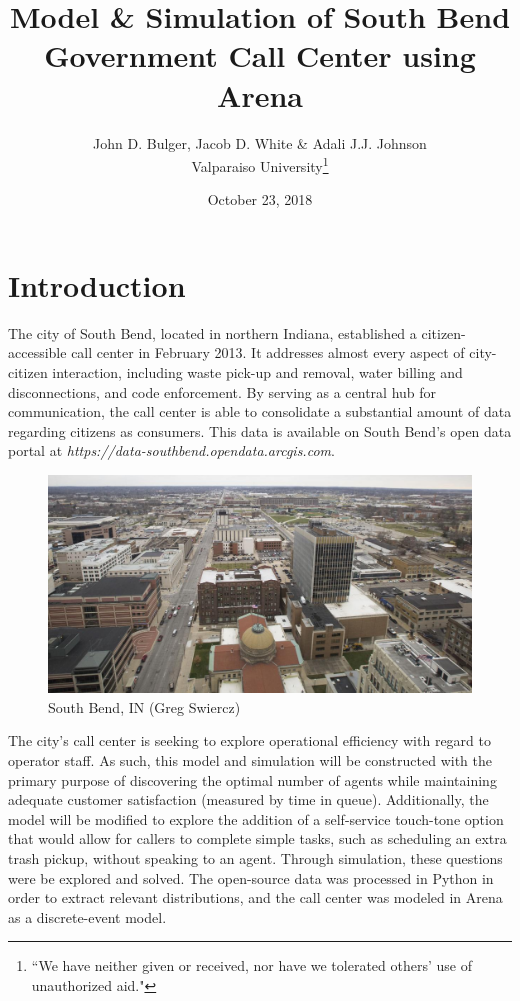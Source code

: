 \documentclass[12pt,twocolumn]{article}
\title{Model \& Simulation of South Bend Government Call Center using Arena}
\author{John D. Bulger, Jacob D. White \& Adali J.J. Johnson\\Valparaiso University\thanks{``We have neither given or received, nor have we tolerated others' use of unauthorized aid."}}
\date{October 23, 2018}
\begin{document}
\maketitle

\section{Introduction}
The city of South Bend, located in northern Indiana, established a citizen-accessible call center in February 2013.  It addresses almost every aspect of city-citizen interaction, including waste pick-up and removal, water billing and disconnections, and code enforcement.  By serving as a central hub for communication, the call center is able to consolidate a substantial amount of data regarding citizens as consumers.  This data is available on South Bend's open data portal at \textit{https://data-southbend.opendata.arcgis.com}.

	\begin{figure}[h]
	\includegraphics[scale=.17]{south_bend.png}
	\caption{South Bend, IN (Greg Swiercz)}
	\end{figure}

\par
The city's call center is seeking to explore operational efficiency with regard to operator staff.  As such, this model and simulation will be constructed with the primary purpose of discovering the optimal number of agents while maintaining adequate customer satisfaction (measured by time in queue).  Additionally, the model will be modified to explore the addition of a self-service touch-tone option that would allow for callers to complete simple tasks, such as scheduling an extra trash pickup, without speaking to an agent.  Through simulation, these questions were be explored and solved.  The open-source data was processed in Python in order to extract relevant distributions, and the call center was modeled in Arena as a discrete-event model.  
\end{document}

